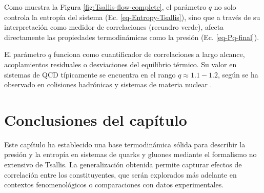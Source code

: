 Como muestra la Figura \ref{fig:Tsallis-flow-complete}, el parámetro $q$ no solo controla la entropía del sistema (Ec. \ref{eq-Entropy-Tsallis}), sino que a través de su interpretación como medidor de correlaciones (recuadro verde), afecta directamente las propiedades termodinámicas como la presión (Ec. \ref{eq-Pq-final}).

\begin{remark}
El parámetro \( q \) funciona como cuantificador de correlaciones a largo alcance, acoplamientos residuales o desviaciones del equilibrio térmico. Su valor en sistemas de QCD típicamente se encuentra en el rango \( q \approx 1.1 - 1.2 \), según se ha observado en colisiones hadrónicas y sistemas de materia nuclear \cite{Bhattacharyya_2018, Tsallis_2014}.
\end{remark}


\section*{Conclusiones del capítulo}
Este capítulo ha establecido una base termodinámica sólida para describir la presión y la entropía en sistemas de quarks y gluones mediante el formalismo no extensivo de Tsallis. La generalización obtenida permite capturar efectos de correlación entre los constituyentes, que serán explorados más adelante en contextos fenomenológicos o comparaciones con datos experimentales.